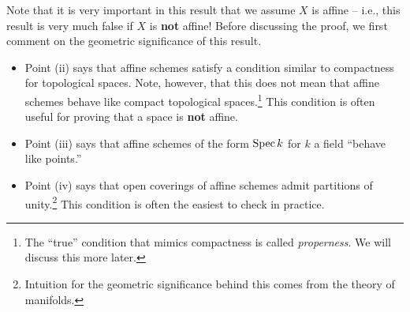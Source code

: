 \documentclass[11pt]{article}
\begin{document}
Note that it is very important in this result that we assume $X$ is affine -- i.e., this result is very much false if $X$ is \textbf{not} affine! Before discussing the proof, we first comment on the geometric significance of this result.
\begin{itemize}
\item Point (ii) says that affine schemes satisfy a condition similar to compactness for topological spaces. Note, however, that this does not mean that affine schemes behave like compact topological spaces.\footnote{The ``true'' condition that mimics compactness is called \emph{properness}. We will discuss this more later.} This condition is often useful for proving that a space is \textbf{not} affine.

\item Point (iii) says that affine schemes of the form $\operatorname{Spec} k$ for $k$ a field ``behave like points.''

\item Point (iv) says that open coverings of affine schemes admit partitions of unity.\footnote{Intuition for the geometric significance behind this comes from the theory of manifolds.} This condition is often the easiest to check in practice.
\end{itemize}
\end{document}
